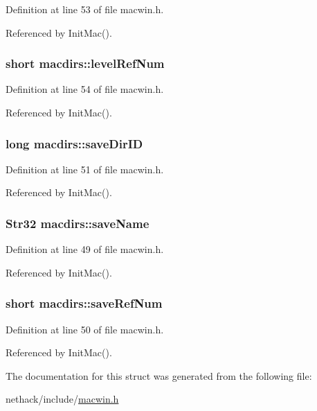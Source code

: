 Definition at line 53 of file macwin.\+h.



Referenced by Init\+Mac().

\hypertarget{structmacdirs_aaf3a71b7feb833f97b975b0cd76a6941}{
\subsubsection[{level\+Ref\+Num}]{\setlength{\rightskip}{0pt plus 5cm}short macdirs\+::level\+Ref\+Num}}\label{structmacdirs_aaf3a71b7feb833f97b975b0cd76a6941}


Definition at line 54 of file macwin.\+h.



Referenced by Init\+Mac().

\hypertarget{structmacdirs_a256ca767b10d11638f1b971e49cbfba6}{
\subsubsection[{save\+Dir\+I\+D}]{\setlength{\rightskip}{0pt plus 5cm}long macdirs\+::save\+Dir\+I\+D}}\label{structmacdirs_a256ca767b10d11638f1b971e49cbfba6}


Definition at line 51 of file macwin.\+h.



Referenced by Init\+Mac().

\hypertarget{structmacdirs_a00453ab702aa65bda1bd408d76efc629}{
\subsubsection[{save\+Name}]{\setlength{\rightskip}{0pt plus 5cm}Str32 macdirs\+::save\+Name}}\label{structmacdirs_a00453ab702aa65bda1bd408d76efc629}


Definition at line 49 of file macwin.\+h.



Referenced by Init\+Mac().

\hypertarget{structmacdirs_aa892776f9ea0b84cf654bee2cf5a0b1f}{
\subsubsection[{save\+Ref\+Num}]{\setlength{\rightskip}{0pt plus 5cm}short macdirs\+::save\+Ref\+Num}}\label{structmacdirs_aa892776f9ea0b84cf654bee2cf5a0b1f}


Definition at line 50 of file macwin.\+h.



Referenced by Init\+Mac().



The documentation for this struct was generated from the following file\+:\begin{DoxyCompactItemize}
\item 
nethack/include/\hyperlink{macwin_8h}{macwin.\+h}\end{DoxyCompactItemize}
